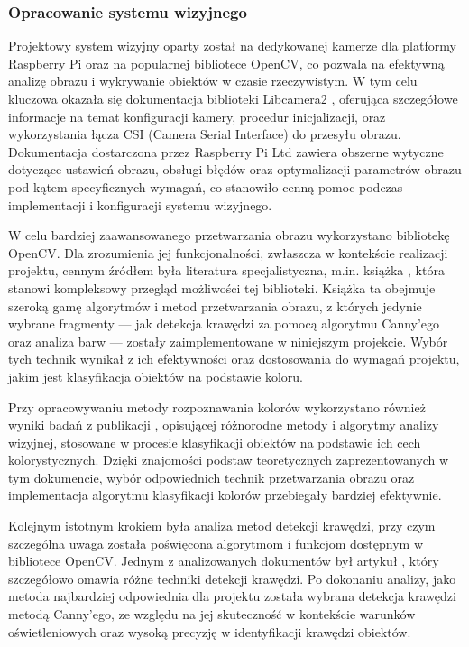 \subsubsection*{Opracowanie systemu wizyjnego}

Projektowy system wizyjny oparty został na dedykowanej kamerze dla platformy Raspberry Pi oraz na popularnej bibliotece OpenCV, co pozwala na efektywną analizę obrazu i wykrywanie obiektów w czasie rzeczywistym. W tym celu kluczowa okazała się dokumentacja biblioteki Libcamera2 \cite{bib:manualLibcamera2}, oferująca szczegółowe informacje na temat konfiguracji kamery, procedur inicjalizacji, oraz wykorzystania łącza CSI (Camera Serial Interface) do przesyłu obrazu. Dokumentacja dostarczona przez Raspberry Pi Ltd zawiera obszerne wytyczne dotyczące ustawień obrazu, obsługi błędów oraz optymalizacji parametrów obrazu pod kątem specyficznych wymagań, co stanowiło cenną pomoc podczas implementacji i konfiguracji systemu wizyjnego.

W celu bardziej zaawansowanego przetwarzania obrazu wykorzystano bibliotekę OpenCV. Dla zrozumienia jej funkcjonalności, zwłaszcza w kontekście realizacji projektu, cennym źródłem była literatura specjalistyczna, m.in. książka \cite{bib:ksiazka}, która stanowi kompleksowy przegląd możliwości tej biblioteki. Książka ta obejmuje szeroką gamę algorytmów i metod przetwarzania obrazu, z których jedynie wybrane fragmenty — jak detekcja krawędzi za pomocą algorytmu Canny’ego oraz analiza barw — zostały zaimplementowane w niniejszym projekcie. Wybór tych technik wynikał z ich efektywności oraz dostosowania do wymagań projektu, jakim jest klasyfikacja obiektów na podstawie koloru.

Przy opracowywaniu metody rozpoznawania kolorów wykorzystano również wyniki badań z publikacji \cite{bib:artykul2}, opisującej różnorodne metody i algorytmy analizy wizyjnej, stosowane w procesie klasyfikacji obiektów na podstawie ich cech kolorystycznych. Dzięki znajomości podstaw teoretycznych zaprezentowanych w tym dokumencie, wybór odpowiednich technik przetwarzania obrazu oraz implementacja algorytmu klasyfikacji kolorów przebiegały bardziej efektywnie.

Kolejnym istotnym krokiem była analiza metod detekcji krawędzi, przy czym szczególna uwaga została poświęcona algorytmom i funkcjom dostępnym w bibliotece OpenCV. Jednym z analizowanych dokumentów był artykuł \cite{bib:artykul}, który szczegółowo omawia różne techniki detekcji krawędzi. Po dokonaniu analizy, jako metoda najbardziej odpowiednia dla projektu została wybrana detekcja krawędzi metodą Canny’ego, ze względu na jej skuteczność w kontekście warunków oświetleniowych oraz wysoką precyzję w identyfikacji krawędzi obiektów.


